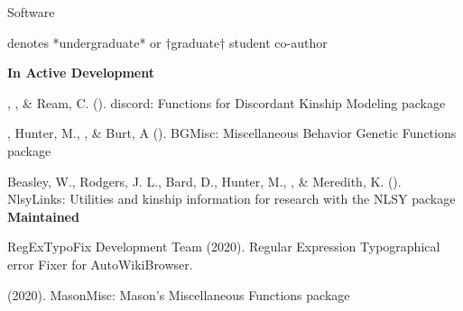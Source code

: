 \begin{rSection}{\textrm{Software}}%
\vspace{-1mm}\begin{center}\footnotesize{denotes *undergraduate* or $\dagger$graduate$\dagger$ student co-author}\end{center}\vspace{-5mm}

{\large \textbf {In Active Development}}%
\begin{etaremune}
\item\meb, \jt, \& Ream, C. (\the\year). discord: Functions for Discordant Kinship Modeling \R package 
%
\item\meb, Hunter, M., \jt, \& Burt, A (\the\year). BGMisc: Miscellaneous Behavior Genetic Functions \R package %
%
%
\item  Beasley, W., Rodgers, J. L., Bard, D., Hunter, M., \meb, \& Meredith, K. (\the\year). NlsyLinks: Utilities and kinship information for research with the NLSY \R package \smallskip\\
%

\pagebreak
\hspace*{-8mm}\large{\bf{Maintained}}

\item RegExTypoFix Development Team (2020). Regular Expression Typographical error Fixer for AutoWikiBrowser. 
%
\item\meb (2020). MasonMisc: Mason's Miscellaneous Functions \R package 
%
%
\end{etaremune}
\end{rSection}
